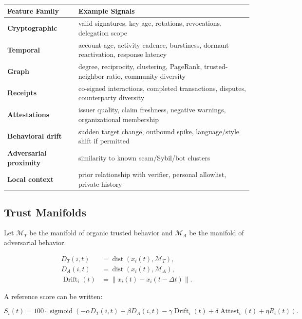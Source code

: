 \documentclass[11pt]{article}
\newcommand{\dist}{\operatorname{dist}}
\newcommand{\sigmoid}{\operatorname{sigmoid}}
\newcommand{\drift}{\operatorname{Drift}}
\newcommand{\attest}{\operatorname{Attest}}
\begin{document}
\begin{center}
\begin{tabularx}{\textwidth}{>{\bfseries}p{} X}
\toprule
Feature Family & Example Signals \\
\midrule
Cryptographic & valid signatures, key age, rotations, revocations, delegation scope \\
Temporal & account age, activity cadence, burstiness, dormant reactivation, response latency \\
Graph & degree, reciprocity, clustering, PageRank, trusted-neighbor ratio, community diversity \\
Receipts & co-signed interactions, completed transactions, disputes, counterparty diversity \\
Attestations & issuer quality, claim freshness, negative warnings, organizational membership \\
Behavioral drift & sudden target change, outbound spike, language/style shift if permitted \\
Adversarial proximity & similarity to known scam/Sybil/bot clusters \\
Local context & prior relationship with verifier, personal allowlist, private history \\
\bottomrule
\end{tabularx}
\end{center}

\subsection{Trust Manifolds}

Let \(\mathcal{M}_T\) be the manifold of organic trusted behavior and \(\mathcal{M}_A\) be the manifold of adversarial behavior.

\begin{align}
    D_T(i,t) &= \dist(x_i(t), \mathcal{M}_T), \\
    D_A(i,t) &= \dist(x_i(t), \mathcal{M}_A), \\
    \drift_i(t) &= \left\|x_i(t) - x_i(t-\Delta t)\right\|.
\end{align}

A reference score can be written:

\begin{equation}
S_i(t) = 100 \cdot \sigmoid\left(
    -\alpha D_T(i,t)
    + \beta D_A(i,t)
    - \gamma \drift_i(t)
    + \delta \attest_i(t)
    + \eta R_i(t)
\right).
\end{equation}
\end{document}
